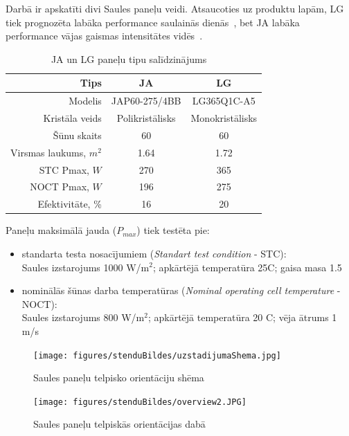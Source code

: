 Darbā ir apskatīti divi Saules paneļu veidi. Atsaucoties uz produktu lapām, LG tiek prognozēta labāka performance saulainās dienās~\cite{LGtips}, bet JA labāka performance vājas gaismas intensitātes vidēs~\cite{JAtips}.

\begin{table}[h]
    \caption{JA un LG paneļu tipu salīdzinājums~\cite{JAtips}~\cite{LGtips}} %
    \begin{center}
    \begin{tabular}{| r | c | c |}
    \hline
    Tips & JA & LG \\ \hline
    Modelis &  JAP60-275/4BB & LG365Q1C-A5\\ \hline
	Kristāla veids & Polikristālisks & Monokristālisks \\ \hline
	Šūnu skaits  &60  &60 \\ \hline
	Virsmas laukums, $m^2$ &1.64  &1.72 \\ \hline
	STC Pmax, $W$ 	&270 &365\\ \hline
	NOCT Pmax, $W$  &196 &275\\ \hline
	Efektivitāte, \% &16 & 20\\ \hline
    \end{tabular}
    \end{center}
    \label{tab:ja_lg_tipi}
\end{table}

Paneļu maksimālā jauda ($P_{max}$) tiek testēta pie:
\begin{itemize}
\item standarta testa nosacījumiem (\textit{Standart test condition} - STC):\\
Saules izstarojums 1000 W/m$^2$; apkārtējā temperatūra 25\textdegree C; gaisa masa 1.5
\item nominālās šūnas darba temperatūras (\textit{Nominal operating cell temperature} - NOCT):\\
Saules izstarojums 800 W/m$^2$; apkārtējā temperatūra 20 \textdegree C; vēja ātrums 1 m/s
\end{itemize}


\begin{figure}[h]
    \centering
    \texttt{[image: figures/stenduBildes/uzstadijumaShema.jpg]}
    \caption{Saules paneļu telpisko orientāciju shēma}
    \label{fig:paneli}
\end{figure}

\begin{figure}[h]
    \centering
    \texttt{[image: figures/stenduBildes/overview2.JPG]}
    \caption{Saules paneļu telpiskās orientācijas dabā}
    \label{fig:paneli}
\end{figure}